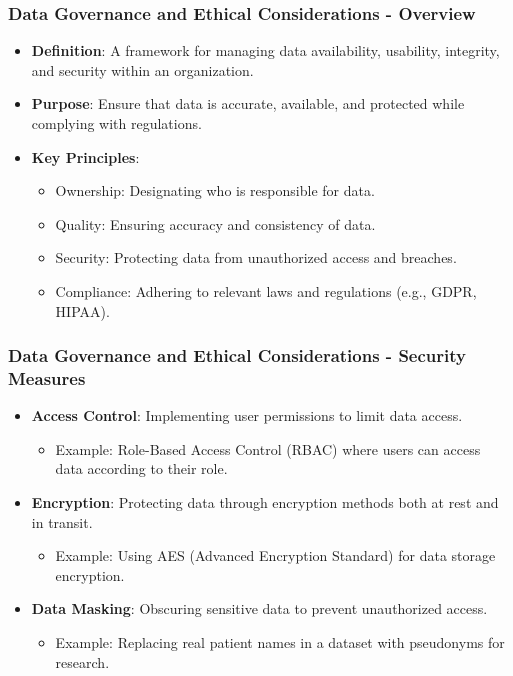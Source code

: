 \documentclass{beamer}
\begin{document}
\begin{frame}[fragile]
    \frametitle{Data Governance and Ethical Considerations - Overview}
    \begin{itemize}
        \item \textbf{Definition}: A framework for managing data availability, usability, integrity, and security within an organization.
        \item \textbf{Purpose}: Ensure that data is accurate, available, and protected while complying with regulations.
        \item \textbf{Key Principles}:
            \begin{itemize}
                \item Ownership: Designating who is responsible for data.
                \item Quality: Ensuring accuracy and consistency of data.
                \item Security: Protecting data from unauthorized access and breaches.
                \item Compliance: Adhering to relevant laws and regulations (e.g., GDPR, HIPAA).
            \end{itemize}
    \end{itemize}
\end{frame}

\begin{frame}[fragile]
    \frametitle{Data Governance and Ethical Considerations - Security Measures}
    \begin{itemize}
        \item \textbf{Access Control}: Implementing user permissions to limit data access.
            \begin{itemize}
                \item Example: Role-Based Access Control (RBAC) where users can access data according to their role.
            \end{itemize}
        \item \textbf{Encryption}: Protecting data through encryption methods both at rest and in transit.
            \begin{itemize}
                \item Example: Using AES (Advanced Encryption Standard) for data storage encryption.
            \end{itemize}
        \item \textbf{Data Masking}: Obscuring sensitive data to prevent unauthorized access.
            \begin{itemize}
                \item Example: Replacing real patient names in a dataset with pseudonyms for research.
            \end{itemize}
    \end{itemize}
\end{frame}
\end{document}
